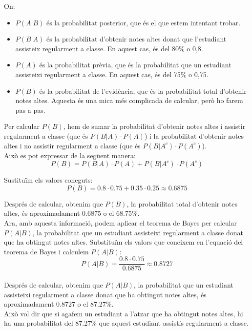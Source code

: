 \documentclass[12pt]{article}
\begin{document}
\begin{exemple} [title=Exemple 1]
On:

\begin{itemize}
    \item \( P(A|B) \) és la probabilitat posterior, que és el que estem intentant trobar.
    \item \( P(B|A) \) és la probabilitat d'obtenir notes altes donat que l'estudiant assisteix regularment a classe. En aquest cas, és del 80\% o 0,8.
    \item \( P(A) \) és la probabilitat prèvia, que és la probabilitat que un estudiant assisteixi regularment a classe. En aquest cas, és del 75\% o 0,75.
    \item \( P(B) \) és la probabilitat de l'evidència, que és la probabilitat total d'obtenir notes altes. Aquesta és una mica més complicada de calcular, però ho farem pas a pas.
\end{itemize}

\end{exemple}

\begin{exemple} [title=]\noindent 
    
Per calcular \( P(B) \), hem de sumar la probabilitat d'obtenir notes altes i assistir regularment a classe (que és \( P(B|A) \cdot P(A) \)) i la probabilitat d'obtenir notes altes i no assistir regularment a classe (que és \( P(B|A^c) \cdot P(A^c) \)). \\

Això es pot expressar de la següent manera:
\[
P(B) = P(B|A) \cdot P(A) + P(B|A^c) \cdot P(A^c)
\]

Sustituïm els valors coneguts:
\[
P(B) = 0.8 \cdot 0.75 + 0.35 \cdot 0.25 \approx 0.6875
\]

Després de calcular, obtenim que \( P(B) \), la probabilitat total d'obtenir notes altes, és aproximadament 0.6875 o el 68.75\%.\\

Ara, amb aquesta informació, podem aplicar el teorema de Bayes per calcular \( P(A|B) \), la probabilitat que un estudiant assisteixi regularment a classe donat que ha obtingut notes altes. Substituïm els valors que coneixem en l'equació del teorema de Bayes i calculem \( P(A|B) \):
\[
P(A|B) = \frac{0.8 \cdot 0.75}{0.6875} \approx 0.8727
\]\\

Després de calcular, obtenim que \( P(A|B) \), la probabilitat que un estudiant assisteixi regularment a classe donat que ha obtingut notes altes, és aproximadament 0.8727 o el 87.27\%. \\

Això vol dir que si agafem un estudiant a l'atzar que ha obtingut notes altes, hi ha una probabilitat del 87.27\% que aquest estudiant assistís regularment a classe.
\end{exemple}
\end{document}

